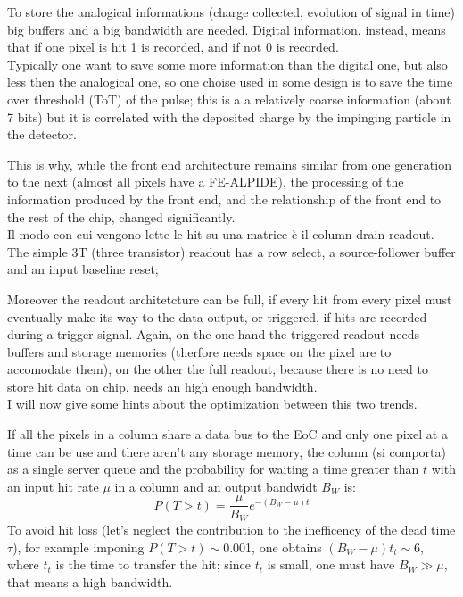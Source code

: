 To store the analogical informations (charge collected, evolution of signal in time)
big buffers and a big bandwidth are needed.
Digital information, instead, means that if one pixel is hit 1 is recorded, and if
not 0 is recorded.\\
Typically one want to save some more information than the digital one, but also
less then the analogical one, so one choise used in some design is to save the time over threshold
(ToT) of the pulse; this is a a relatively coarse information (about 7 bits) but it
is correlated with the deposited charge by the impinging particle in the detector.

This is why, while the front end architecture remains similar from one generation
to the next (almost all pixels have a FE-ALPIDE), the processing of the information
produced by the front end, and the relationship of the front end to the rest of
the chip, changed significantly.\\
Il modo con cui vengono lette le hit su una matrice è il column drain readout.\\
The simple 3T (three transistor) readout has a row select, a
source-follower buffer and an input baseline reset;

Moreover the readout architetcture can be full, if every hit from every pixel must eventually
make its way to the data output, or triggered, if hits are recorded during a trigger signal.
Again, on the one hand the triggered-readout needs buffers and storage memories
(therfore needs space on the pixel are to accomodate them), on the other the full readout,
because there is no need to store hit data on chip, needs an high enough bandwidth.\\
I will now give some hints about the optimization between this two trends.

If all the pixels in a column share a data bus to the EoC and only one pixel at a time can
be use and there aren't any storage memory, the column (si comporta) as a single
server queue and the probability for waiting a time greater than $t$ with an input
hit rate $\mu$ in a column and an output bandwidt $B_W$ is:
\begin{equation}
P(T > t) = \frac{\mu}{B_W} e^{-( B_W-\mu )t}
\end{equation}
To avoid hit loss (let's neglect the contribution to the inefficency of the dead
time $\tau$), for example imponing $P(T > t)\sim$0.001, one obtains
$(B_W -\mu)t_t\sim$6, where $t_t$ is the time to transfer the hit;
since $t_t$ is small, one must have $B_W \gg \mu$, that means a high bandwidth.

